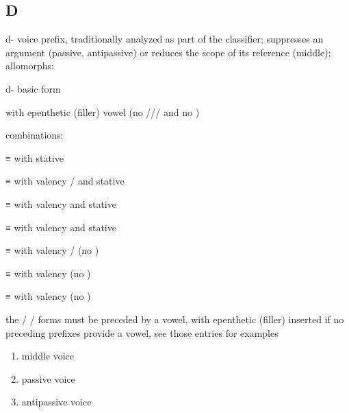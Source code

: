 
\subsection{D}\label{sec:alphalist-d}
\begin{morphdesc}[resume*=alphalist]
\item[d-]\label{m:d-}
	voice prefix, traditionally analyzed as part of the classifier;
	suppresses an argument (passive, antipassive)
	or reduces the scope of its reference (middle);
	\newline
	allomorphs:
	\begin{allolist}
	\item[d-]	basic form
	\item[\X{da-}]	with epenthetic (filler) vowel 
			(no /// and no )
	\end{allolist}
	combinations:
	\begin{allolist}
	\item[\X{di}]	≡  with stative \X[i-stv]{i-}
	\item[\X{dli}]	≡  with valency / and stative \X[i-stv]{i-}
	\item[\X{dzi}]	≡  with valency  and stative \X[i-stv]{i-}
	\item[\X{ji}]	≡  with valency  and stative \X[i-stv]{i-}
	\item[\X{…l}]	≡  with valency / (no \fm{i-})
	\item[\X{…s}]	≡  with valency  (no \fm{i-})
	\item[\X{…sh}]	≡  with valency  (no \fm{i-})
	\end{allolist}
	the  /  /  forms must be preceded by a vowel,
		with epenthetic (filler)  inserted if no preceding prefixes provide a vowel,
		see those entries for examples
	\begin{enumerate}
	\item	middle voice
	\item	passive voice
	\item	antipassive voice
	\end{enumerate}


\end{morphdesc}
